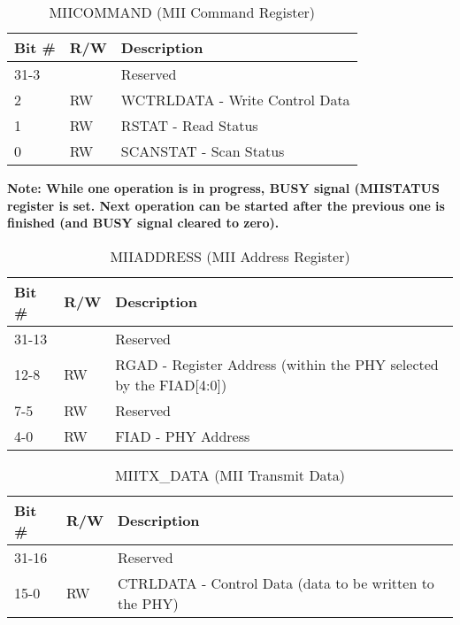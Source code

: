 \begin{table}[H]
  \centering
  \begin{tabularx}{\textwidth}{|l|l|X|}
    
    \hline
    \rowcolor{iob-green}
    {\bf Bit \#} & {\bf R/W} & {\bf Description} \\ \hline

    31-3   &   & Reserved \\ \hline
    \rowcolor{iob-blue}
    2      & RW & WCTRLDATA - Write Control Data \\ \hline
    1      & RW & RSTAT - Read Status \\ \hline
    \rowcolor{iob-blue}
    0      & RW & SCANSTAT - Scan Status \\ \hline
  \end{tabularx}
    \caption{MIICOMMAND (MII Command Register)}
  \label{swreg_details:miicommand}
\end{table}

\textbf{Note: While one operation is in progress, BUSY signal (MIISTATUS
register is set. Next operation can be started after the previous one is
finished (and BUSY signal cleared to zero).}

\begin{table}[H]
  \centering
  \begin{tabularx}{\textwidth}{|l|l|X|}
    
    \hline
    \rowcolor{iob-green}
    {\bf Bit \#} & {\bf R/W} & {\bf Description} \\ \hline

    31-13   &   & Reserved \\ \hline
    \rowcolor{iob-blue}
    12-8    & RW & RGAD - Register Address (within the PHY selected by the
                        FIAD[4:0]) \\ \hline
    7-5     & RW & Reserved \\ \hline
    \rowcolor{iob-blue}
    4-0     & RW & FIAD - PHY Address \\ \hline
  \end{tabularx}
    \caption{MIIADDRESS (MII Address Register)}
  \label{swreg_details:miiaddress}
\end{table}

\begin{table}[H]
  \centering
  \begin{tabularx}{\textwidth}{|l|l|X|}
    
    \hline
    \rowcolor{iob-green}
    {\bf Bit \#} & {\bf R/W} & {\bf Description} \\ \hline

    31-16   &   & Reserved \\ \hline
    \rowcolor{iob-blue}
      15-0    & RW &  CTRLDATA - Control Data (data to be written to the PHY)
                    \\ \hline
  \end{tabularx}
    \caption{MIITX\_DATA (MII Transmit Data)}
  \label{swreg_details:miitx_data}
\end{table}

